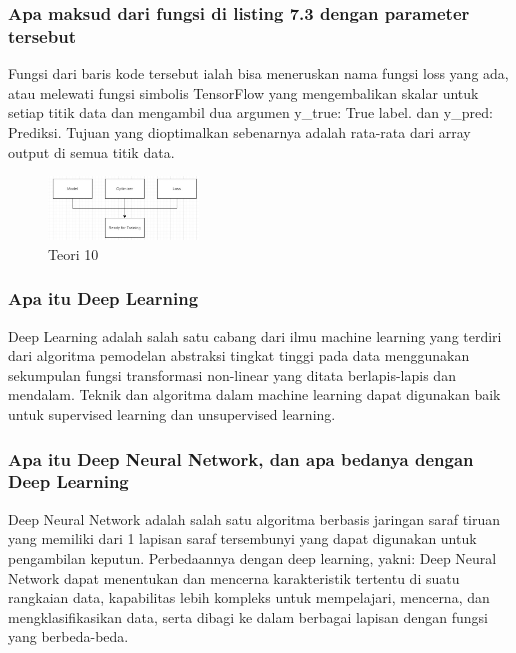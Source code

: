 \subsubsection{Apa maksud dari fungsi di listing 7.3 dengan parameter tersebut}
\hfill\break

Fungsi dari baris kode tersebut ialah bisa meneruskan nama fungsi loss yang ada, atau melewati fungsi simbolis TensorFlow yang mengembalikan skalar untuk setiap titik data dan mengambil dua argumen y\_true: True label. dan  y\_pred: Prediksi. Tujuan yang dioptimalkan sebenarnya adalah rata-rata dari array output di semua titik data.
\begin{figure}[H]
\centering
	\includegraphics[width=4cm]{figures/1174053/7/10.jpg}
\caption{Teori 10}
\end{figure}

\subsubsection{Apa itu Deep Learning}
\hfill\break
Deep Learning adalah salah satu cabang dari ilmu machine learning yang terdiri dari algoritma pemodelan abstraksi tingkat tinggi pada data menggunakan sekumpulan fungsi transformasi non-linear yang ditata berlapis-lapis dan mendalam. Teknik dan algoritma dalam machine learning dapat digunakan baik untuk supervised learning dan unsupervised learning.

\subsubsection{Apa itu Deep Neural Network, dan apa bedanya dengan Deep Learning}
\hfill\break
Deep Neural Network adalah salah satu algoritma berbasis jaringan saraf tiruan yang memiliki dari 1 lapisan saraf tersembunyi yang dapat digunakan untuk pengambilan keputun. Perbedaannya dengan deep learning, yakni: Deep Neural Network dapat menentukan dan mencerna karakteristik tertentu di suatu rangkaian data, kapabilitas lebih kompleks untuk mempelajari, mencerna, dan mengklasifikasikan data, serta dibagi ke dalam berbagai lapisan dengan fungsi yang berbeda-beda.

